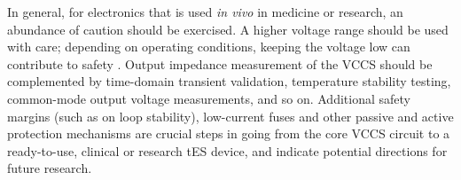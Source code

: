 \documentclass[conference]{IEEEtran}
\begin{document}
In general, for electronics that is used \emph{in vivo} in medicine or research, an abundance of caution should be exercised. A higher voltage range should be used with care; depending on operating conditions, keeping the voltage low can contribute to safety \cite{pmid15661300}. Output impedance measurement of the VCCS should be complemented by time-domain transient validation, temperature stability testing, common-mode output voltage measurements, and so on. Additional safety margins (such as on loop stability), low-current fuses and other passive and active protection mechanisms are crucial steps in going from the core VCCS circuit to a ready-to-use, clinical or research tES device, and indicate potential directions for future research.
\balance



\end{document}
